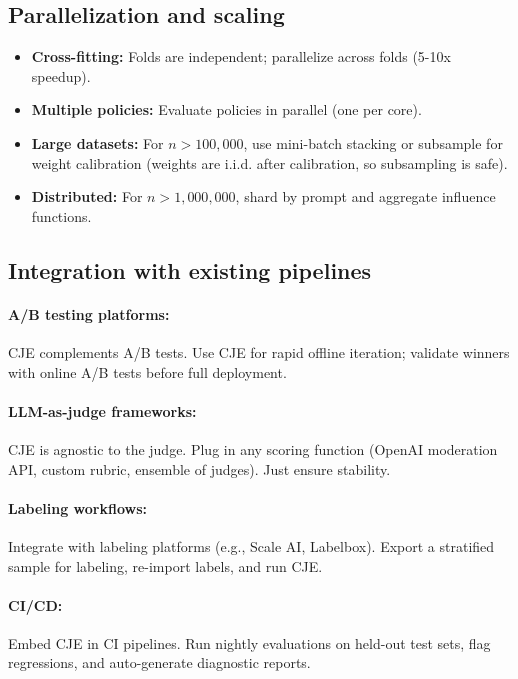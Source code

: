 \subsection{Parallelization and scaling}

\begin{itemize}
\item \textbf{Cross-fitting:} Folds are independent; parallelize across folds (5-10x speedup).
\item \textbf{Multiple policies:} Evaluate policies in parallel (one per core).
\item \textbf{Large datasets:} For $n > 100{,}000$, use mini-batch stacking or subsample for weight calibration (weights are i.i.d. after calibration, so subsampling is safe).
\item \textbf{Distributed:} For $n > 1{,}000{,}000$, shard by prompt and aggregate influence functions.
\end{itemize}

\subsection{Integration with existing pipelines}

\paragraph{A/B testing platforms:} CJE complements A/B tests. Use CJE for rapid offline iteration; validate winners with online A/B tests before full deployment.

\paragraph{LLM-as-judge frameworks:} CJE is agnostic to the judge. Plug in any scoring function (OpenAI moderation API, custom rubric, ensemble of judges). Just ensure stability.

\paragraph{Labeling workflows:} Integrate with labeling platforms (e.g., Scale AI, Labelbox). Export a stratified sample for labeling, re-import labels, and run CJE.

\paragraph{CI/CD:} Embed CJE in CI pipelines. Run nightly evaluations on held-out test sets, flag regressions, and auto-generate diagnostic reports.

